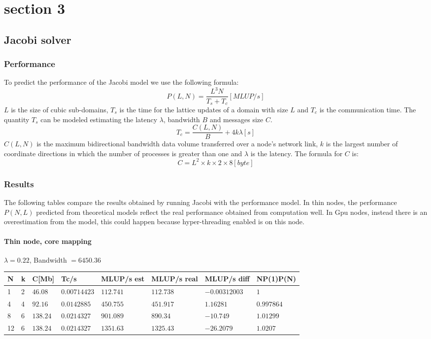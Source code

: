 \documentclass[11pt,a4paper]{report}
\theoremstyle{definition}
\begin{document}
\chapter{section 3}
\section{Jacobi solver}
\subsection{Performance}
To predict the performance of the Jacobi model we use the following formula:
\begin{equation*}
P(L,N) = \dfrac{L^{3}N}{T_{s} + T_{c}}[MLUP/s]
\end{equation*}
$L$ is the size of cubic sub-domains, $T_{s}$ is the time for the lattice updates of a domain with size $L$ and $T_{c}$ is the communication time.  The quantity $T_{s}$ can be modeled estimating the latency $\lambda$, bandwidth $B$ and messages size $C$.  
\begin{equation*}
T_{c} = \dfrac{C(L,N)}{B} + 4k\lambda [s]
\end{equation*}
$C(L,N)$ is the maximum bidirectional bandwidth data volume transferred over a node's network link, $k$ is the largest number of coordinate directions in which the number of processes is greater than one and $\lambda$ is the latency. The formula for $C$ is:
\begin{equation*}
C = L^{2} \times k \times 2 \times 8 [byte]
\end{equation*}
\subsection{Results}
The following tables compare the results obtained by running Jacobi with the performance model. In thin nodes, the performance $P(N,L)$ predicted from theoretical models reflect the real performance obtained from computation well. In Gpu nodes, instead there is an overestimation from the model, this could happen because hyper-threading enabled is on this node. 
\subsubsection{Thin node, core mapping}
$\lambda = 0.22$, Bandwidth $= 6450.36$
\begin{center}
\begin{tabular}{llllllll} %
\toprule
N & k & C[Mb] & Tc/s & MLUP/s est & MLUP/s real & MLUP/s diff &NP(1)P(N) \\
\midrule
1  & 2	& $46.08$	& $0.00714423$ 	& $112.741 $ 	& $112.738$ 	& $-0.00312003$ & $1$ \\
4  & 4	& $92.16$	& $0.0142885$	& $450.755$		& $451.917$		& $1.16281$ & $0.997864$\\
8  & 6	& $138.24$	& $0.0214327$ 	& $901.089$		& $890.34$		& $-10.749$ & $1.01299$\\
12 & 6	& $138.24$	& $0.0214327$	& $1351.63$		& $1325.43$		& $-26.2079$ & $1.0207$\\
\bottomrule
\end{tabular}
\end{center}
\end{document}
